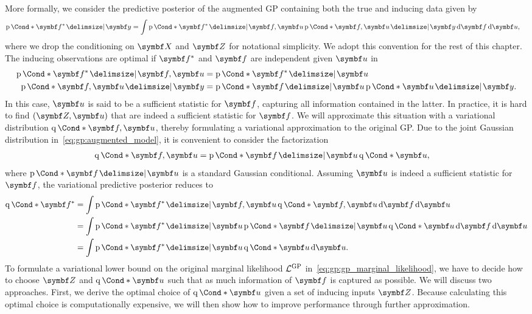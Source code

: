 More formally, we consider the predictive posterior of the augmented GP containing both the true and inducing data given by
\begin{align}
    \Prob*{\mat{f^\ast} \given \mat{y}}
     & = \int \Prob*{\mat{f^\ast} \given \mat{f}, \mat{u}} \Prob*{\mat{f}, \mat{u} \given \mat{y}} \diff \mat{f} \diff \mat{u},
\end{align}
where we drop the conditioning on $\mat{X}$ and $\mat{Z}$ for notational simplicity.
We adopt this convention for the rest of this chapter.
The inducing observations are optimal if $\mat{f^\ast}$ and $\mat{f}$ are independent given $\mat{u}$ in
\begin{equation}
    \begin{split}
        \Prob*{\mat{f^\ast} \given \mat{f}, \mat{u}}
        & = \Prob*{\mat{f^\ast} \given \mat{u}}                           \\
        \Prob*{\mat{f}, \mat{u} \given \mat{y}}
        & = \Prob*{\mat{f} \given \mat{u}} \Prob*{\mat{u} \given \mat{y}}.
    \end{split}
\end{equation}
In this case, $\mat{u}$ is said to be a sufficient statistic for $\mat{f}$, capturing all information contained in the latter.
In practice, it is hard to find $(\mat{Z}, \mat{u})$ that are indeed a sufficient statistic for $\mat{f}$.
We will approximate this situation with a variational distribution $\Variat*{\mat{f}, \mat{u}}$, thereby formulating a variational approximation to the original GP.
Due to the joint Gaussian distribution in~\cref{eq:gp:augmented_model}, it is convenient to consider the factorization
\begin{align}
    \Variat*{\mat{f}, \mat{u}}
     & = \Prob*{\mat{f} \given \mat{u}} \Variat*{\mat{u}},
\end{align}
where $\Prob*{\mat{f} \given \mat{u}}$ is a standard Gaussian conditional.
Assuming $\mat{u}$ is indeed a sufficient statistic for $\mat{f}$, the variational predictive posterior reduces to
\begin{equation}
    \begin{split}
        \label{eq:gp:sgpr_predictive_posterior}
        \Variat*{\mat{f^\ast}}
        & = \int \Prob*{\mat{f^\ast} \given \mat{f}, \mat{u}} \Variat*{\mat{f}, \mat{u}} \diff \mat{f} \diff \mat{u}              \\
        & = \int \Prob*{\mat{f^\ast} \given \mat{u}} \Prob*{\mat{f} \given \mat{u}} \Variat*{\mat{u}} \diff \mat{f} \diff \mat{u} \\
        & = \int \Prob*{\mat{f^\ast} \given \mat{u}} \Variat*{\mat{u}} \diff \mat{u}.
    \end{split}
\end{equation}
To formulate a variational lower bound on the original marginal likelihood $\mathcal{L}^{\text{GP}}$ in~\cref{eq:gp:gp_marginal_likelihood}, we have to decide how to choose $\mat{Z}$ and $\Variat*{\mat{u}}$ such that as much information of $\mat{f}$ is captured as possible.
We will discuss two approaches.
First, we derive the optimal choice of $\Variat*{\mat{u}}$ given a set of inducing inputs $\mat{Z}$.
Because calculating this optimal choice is computationally expensive, we will then show how to improve performance through further approximation.

